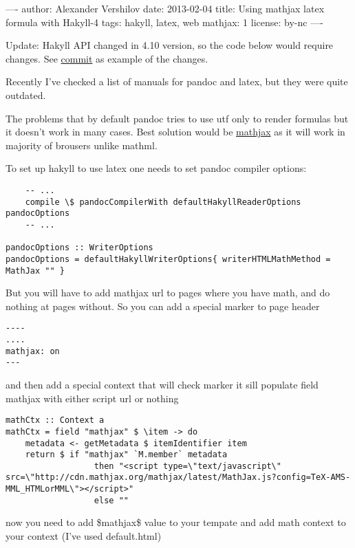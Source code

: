 ----
author: Alexander Vershilov
date: 2013-02-04
title: Using mathjax latex formula with Hakyll-4
tags: hakyll, latex, web
mathjax: 1
license: by-nc
----

Update: Hakyll API changed in 4.10 version, so the code below would require changes.
See \href{https://github.com/qnikst/qnikst.github.com/commit/5b6673237388c64a194ea9bc264b14c860880f35#diff-98a3ddc5c474fd14c4ee9401c03197a1}{commit} as example of the changes.

Recently I've checked a list of manuals for pandoc and latex, but they
were quite outdated.

The problems that by default pandoc tries to use utf only to render
formulas but it doesn't work in many cases. Best solution would be
\href{http://www.mathjax.org/}{mathjax} as it will work in majority of
brousers unlike mathml.

To set up hakyll to use latex one needs to set pandoc compiler options:

\begin{verbatim}
    -- ...
    compile \$ pandocCompilerWith defaultHakyllReaderOptions pandocOptions 
    -- ...

pandocOptions :: WriterOptions
pandocOptions = defaultHakyllWriterOptions{ writerHTMLMathMethod = MathJax "" }
\end{verbatim}

But you will have to add mathjax url to pages where you have math, and do
nothing at pages without. So you can add a special marker to page 
header

\begin{verbatim}
----
....
mathjax: on
---
\end{verbatim}

and then add a special context that will check marker it sill populate field
mathjax with either script url or nothing

\begin{verbatim}
mathCtx :: Context a
mathCtx = field "mathjax" $ \item -> do
    metadata <- getMetadata $ itemIdentifier item
    return $ if "mathjax" `M.member` metadata
                  then "<script type=\"text/javascript\" src=\"http://cdn.mathjax.org/mathjax/latest/MathJax.js?config=TeX-AMS-MML_HTMLorMML\"></script>"
                  else ""
\end{verbatim}

now you need to add \$mathjax\$ value to your tempate and add math context to
your context (I've used default.html)

